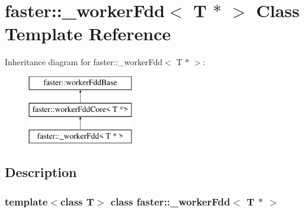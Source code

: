 \hypertarget{classfaster_1_1__workerFdd_3_01T_01_5_01_4}{}\section{faster\+:\+:\+\_\+worker\+Fdd$<$ T $\ast$ $>$ Class Template Reference}
\label{classfaster_1_1__workerFdd_3_01T_01_5_01_4}
Inheritance diagram for faster\+:\+:\+\_\+worker\+Fdd$<$ T $\ast$ $>$\+:\begin{figure}[H]
\begin{center}
\leavevmode
\includegraphics[height=3.000000cm]{classfaster_1_1__workerFdd_3_01T_01_5_01_4}
\end{center}
\end{figure}


\subsection{Description}
\subsubsection*{template$<$class T$>$\newline
class faster\+::\+\_\+worker\+Fdd$<$ T $\ast$ $>$}

